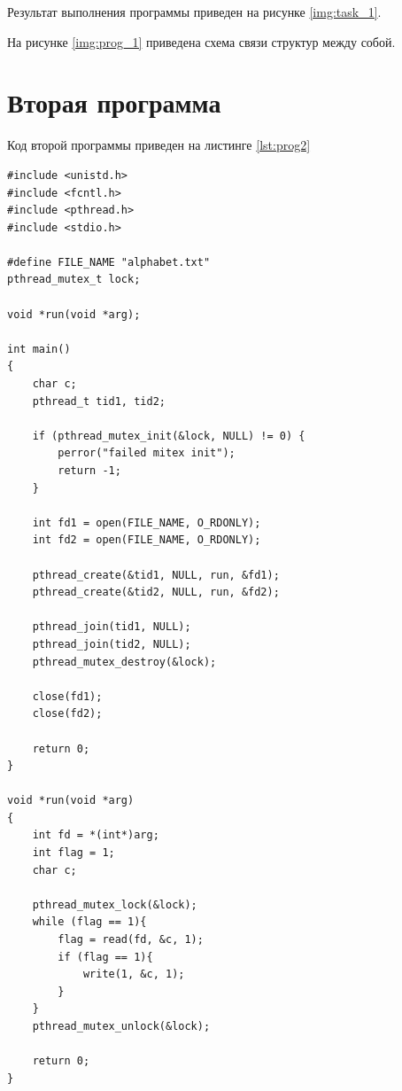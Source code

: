 Результат выполнения программы приведен на рисунке \ref{img:task_1}.
\begin{figure}[H]
\end{figure}

На рисунке \ref{img:prog_1} приведена схема связи структур между собой.
\begin{figure}[H]
\end{figure}

\section{Вторая программа}
Код второй программы приведен на листинге \ref{lst:prog2}
\begin{lstlisting}[label=lst:prog2, caption=Код программы 2, basicstyle=\footnotesize]
#include <unistd.h>
#include <fcntl.h>
#include <pthread.h>
#include <stdio.h>

#define FILE_NAME "alphabet.txt"
pthread_mutex_t lock;

void *run(void *arg);

int main()
{
	char c;
	pthread_t tid1, tid2;
	
	if (pthread_mutex_init(&lock, NULL) != 0) {
		perror("failed mitex init");
		return -1;
	}
	
	int fd1 = open(FILE_NAME, O_RDONLY);
	int fd2 = open(FILE_NAME, O_RDONLY);
	
	pthread_create(&tid1, NULL, run, &fd1);
	pthread_create(&tid2, NULL, run, &fd2);
	
	pthread_join(tid1, NULL);
	pthread_join(tid2, NULL);
	pthread_mutex_destroy(&lock);
	
	close(fd1);
	close(fd2);
	
	return 0;
}

void *run(void *arg)
{
	int fd = *(int*)arg;
	int flag = 1; 
	char c;
	
	pthread_mutex_lock(&lock);
	while (flag == 1){
		flag = read(fd, &c, 1);
		if (flag == 1){
			write(1, &c, 1);
		}
	}
	pthread_mutex_unlock(&lock);
	
	return 0;
}
\end{lstlisting}

